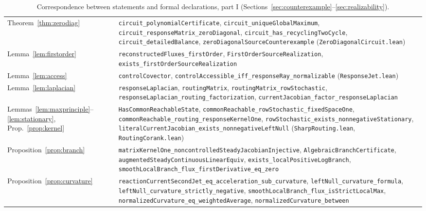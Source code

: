 \documentclass[11pt,reqno]{amsart}
\theoremstyle{plain}
\theoremstyle{definition}
\theoremstyle{remark}
\numberwithin{equation}{section}
\begin{document}
\begin{table}[H]
\begin{tabular}{@{}>{\raggedright\arraybackslash}p{}>{\raggedright\arraybackslash}p{}@{}}
Theorem~\ref{thm:zerodiag} & \texttt{circuit\_\allowbreak polynomialCertificate}, \texttt{circuit\_\allowbreak uniqueGlobalMaximum}, \texttt{circuit\_\allowbreak responseMatrix\_\allowbreak zeroDiagonal}, \texttt{circuit\_\allowbreak has\_\allowbreak recyclingTwoCycle}, \texttt{circuit\_\allowbreak detailedBalance}, \texttt{zeroDiagonalSourceCounterexample} (\texttt{ZeroDiagonalCircuit.lean}) \\
Lemma~\ref{lem:firstorder} & \texttt{reconstructedFluxes\_\allowbreak firstOrder}, \texttt{FirstOrderSourceRealization}, \texttt{exists\_\allowbreak firstOrderSourceRealization} \\
Lemma~\ref{lem:access} & \texttt{controlCovector}, \texttt{controlAccessible\_\allowbreak iff\_\allowbreak responseRay\_\allowbreak normalizable} (\texttt{ResponseJet.lean}) \\
Lemma~\ref{lem:laplacian} & \texttt{responseLaplacian}, \texttt{routingMatrix}, \texttt{routingMatrix\_\allowbreak rowStochastic}, \texttt{responseLaplacian\_\allowbreak routing\_\allowbreak factorization}, \texttt{currentJacobian\_\allowbreak factor\_\allowbreak responseLaplacian} \\
Lemmas~\ref{lem:maxprinciple}--\ref{lem:stationary}, Prop.~\ref{prop:kernel} & \texttt{HasCommonReachableState}, \texttt{commonReachable\_\allowbreak rowStochastic\_\allowbreak fixedSpaceOne}, \texttt{commonReachable\_\allowbreak routing\_\allowbreak responseKernelOne}, \texttt{rowStochastic\_\allowbreak exists\_\allowbreak nonnegativeStationary}, \texttt{literalCurrentJacobian\_\allowbreak exists\_\allowbreak nonnegativeLeftNull} (\texttt{SharpRouting.lean}, \texttt{RoutingCorank.lean}) \\
Proposition~\ref{prop:branch} & \texttt{matrixKernelOne\_\allowbreak noncontrolledSteadyJacobianInjective}, \texttt{AlgebraicBranchCertificate}, \texttt{augmentedSteadyContinuousLinearEquiv}, \texttt{exists\_\allowbreak localPositiveLogBranch}, \texttt{smoothLocalBranch\_\allowbreak flux\_\allowbreak firstDerivative\_\allowbreak eq\_\allowbreak zero} \\
Proposition~\ref{prop:curvature} & \texttt{reactionCurrentSecondJet\_\allowbreak eq\_\allowbreak acceleration\_\allowbreak sub\_\allowbreak curvature}, \texttt{leftNull\_\allowbreak curvature\_\allowbreak formula}, \texttt{leftNull\_\allowbreak curvature\_\allowbreak strictly\_\allowbreak negative}, \texttt{smoothLocalBranch\_\allowbreak flux\_\allowbreak isStrictLocalMax}, \texttt{normalizedCurvature\_\allowbreak eq\_\allowbreak weightedAverage}, \texttt{normalizedCurvature\_\allowbreak between} \\
\bottomrule
\end{tabular}
\caption{Correspondence between statements and formal declarations, part I (Sections~\ref{sec:counterexample}--\ref{sec:realizability}).}
\label{tab:lean}
\end{table}
\end{document}

